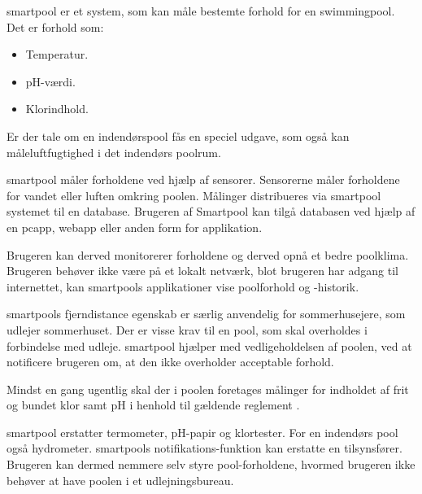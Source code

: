 \gls{smartpool} er et system, som kan måle bestemte forhold for en swimmingpool. 
Det er forhold som:

\begin{itemize}
	\item Temperatur.
	\item pH-værdi.
	\item Klorindhold.
\end{itemize}

Er der tale om en indendørspool fås en speciel udgave, som også kan måleluftfugtighed i det indendørs poolrum.

\gls{smartpool} måler forholdene ved hjælp af sensorer. Sensorerne måler forholdene for vandet eller luften omkring poolen. Målinger distribueres via \gls{smartpool} systemet til en database. Brugeren af Smartpool kan tilgå databasen ved hjælp af en \gls{pcapp}, \gls{webapp} eller anden form for applikation. 

Brugeren kan derved monitorerer forholdene og derved opnå et bedre poolklima. Brugeren behøver ikke være på et lokalt netværk, blot brugeren har adgang til internettet, kan \glspl{smartpool} applikationer vise poolforhold og -historik. 

\glspl{smartpool} fjerndistance egenskab er særlig anvendelig for sommerhusejere, som udlejer sommerhuset. Der er visse krav til en pool, som skal overholdes i forbindelse med udleje\cite{feriehusudlejernesbrancheforening2012}. \gls{smartpool} hjælper med vedligeholdelsen af poolen, ved at notificere brugeren om, at den ikke overholder acceptable forhold. 

Mindst en gang ugentlig skal der i poolen foretages målinger for indholdet af frit og bundet klor samt pH i henhold til gældende reglement \cite{feriehusudlejernesbrancheforening2012}.

\gls{smartpool} erstatter termometer, pH-papir og klortester. For en indendørs pool også hydrometer. \glspl{smartpool} notifikations-funktion kan erstatte en tilsynsfører. Brugeren kan dermed nemmere selv styre pool-forholdene, hvormed brugeren ikke behøver at have poolen i et udlejningsbureau.
